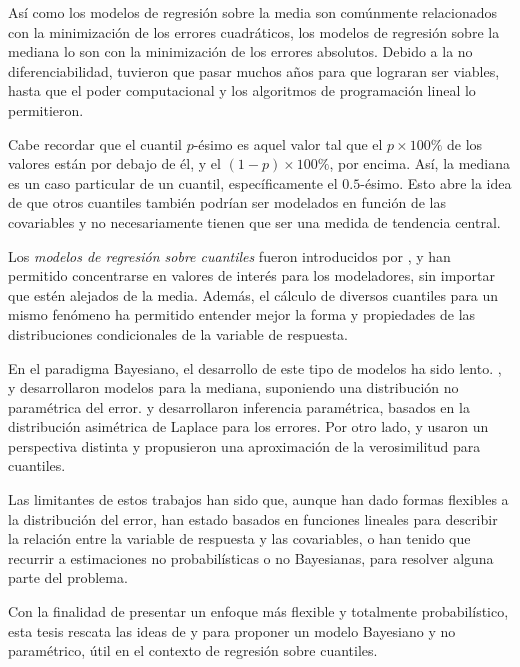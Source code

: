 As\'i como los modelos de regresi\'on sobre la media son com\'unmente relacionados con la minimizaci\'on de los errores cuadr\'aticos, los modelos de regresi\'on sobre la mediana lo son con la minimizaci\'on de los errores absolutos. Debido a la no diferenciabilidad, tuvieron que pasar muchos años para que lograran ser viables, hasta que el poder computacional y los algoritmos de programaci\'on lineal lo permitieron.

Cabe recordar que el cuantil $p$-\'esimo es aquel valor tal que el $p \times 100\%$ de los valores est\'an por debajo de \'el, y el $(1-p)\times 100\%$, por encima. As\'i, la mediana es un caso particular de un cuantil, espec\'ificamente el $0.5$-\'esimo. Esto abre la idea de que otros cuantiles tambi\'en podr\'ian ser modelados en funci\'on de las covariables y no necesariamente tienen que ser una medida de tendencia central. 

Los \textit{modelos de regresi\'on sobre cuantiles} fueron introducidos por \cite{Koenker_QuantReg}, y han permitido concentrarse en valores de inter\'es para los modeladores, sin importar que est\'en alejados de la media. Adem\'as, el c\'alculo de diversos cuantiles para un mismo fen\'omeno ha permitido entender mejor la forma y propiedades de las distribuciones condicionales de la variable de respuesta.

En el paradigma Bayesiano, el desarrollo de este tipo de modelos ha sido lento. \cite{Walker_BayesAccFail}, \cite{Kottas_BaySemiparamMed} y \cite{Hanson_PolyaTrees} desarrollaron modelos para la mediana, suponiendo una distribuci\'on no param\'etrica del error. \cite{Yu_BayQuantReg} y \cite{Tsionas_BayQuantInf} desarrollaron inferencia param\'etrica, basados en la distribuci\'on asim\'etrica de Laplace para los errores. Por otro lado, \cite{Lavine_LikeQuant} y \cite{Dunson_ApproxBayes} usaron un perspectiva distinta y propusieron una aproximaci\'on de la verosimilitud para cuantiles.

Las limitantes de estos trabajos han sido que, aunque han dado formas flexibles a la distribuci\'on del error, han estado basados en funciones lineales para describir la relaci\'on entre la variable de respuesta y las covariables, o han tenido que recurrir a estimaciones no probabil\'isticas o no Bayesianas, para resolver alguna parte del problema.

Con la finalidad de presentar un enfoque m\'as flexible y totalmente probabil\'istico, esta tesis rescata las ideas de \cite{Kottas_NotParamQuantReg} y \cite{Kottas_SemiparamQuantReg} para proponer un modelo Bayesiano y no param\'etrico, \'util en el contexto de regresi\'on sobre cuantiles.

\newpage